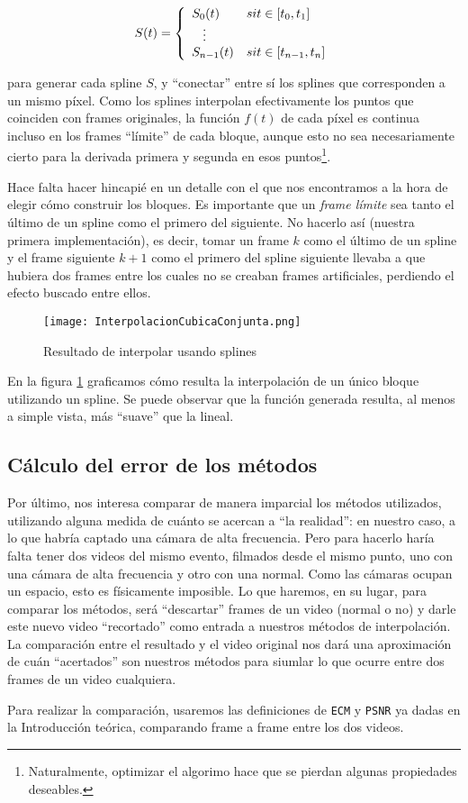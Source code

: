 $$
S(t) = 
\left\{
    \begin{array}{ll}
        S_0(t)  & \mbox{si } t \in [t_{0}, t_1] \\
        \hspace{0.3cm}\vdots \\     
        S_{n - 1}(t) & \mbox{si } t \in [t_{n - 1}, t_n]
    \end{array}
\right.
$$

para generar cada spline $S$, y ``conectar'' entre sí los splines que corresponden a un mismo píxel. Como los splines interpolan efectivamente los puntos que coinciden con frames originales, la función $f(t)$ de cada píxel es continua incluso en los frames ``límite'' de cada bloque, aunque esto no sea necesariamente cierto para la derivada primera y segunda en esos puntos\footnote{Naturalmente, optimizar el algorimo hace que se pierdan algunas propiedades deseables.}.

Hace falta hacer hincapié en un detalle con el que nos encontramos a la hora de elegir cómo construir los bloques. Es importante que un \emph{frame límite} sea tanto el último de un spline como el primero del siguiente. No hacerlo así (nuestra primera implementación), es decir, tomar un frame $k$ como el último de un spline y el frame siguiente $k+1$ como el primero del spline siguiente llevaba a que hubiera dos frames entre los cuales no se creaban frames artificiales, perdiendo el efecto buscado entre ellos.

\begin{figure}[h!]
  \centering
    \texttt{[image: InterpolacionCubicaConjunta.png]}
     \caption{Resultado de interpolar usando splines}\label{fig:intConjuntaSplines}
\end{figure}
\noindent

En la figura \ref{fig:intConjuntaSplines} graficamos cómo resulta la interpolación de un único bloque utilizando un spline. Se puede observar que la función generada resulta, al menos a simple vista, más ``suave'' que la lineal.

\subsection{Cálculo del error de los métodos}
Por último, nos interesa comparar de manera imparcial los métodos utilizados, utilizando alguna medida de cuánto se acercan a ``la realidad'': en nuestro caso, a lo que habría captado una cámara de alta frecuencia. Pero para hacerlo haría falta tener dos videos del mismo evento, filmados desde el mismo punto, uno con una cámara de alta frecuencia y otro con una normal. Como las cámaras ocupan un espacio, esto es físicamente imposible\cite{wiki_impenetrability}. Lo que haremos, en su lugar, para comparar los métodos, será ``descartar'' frames de un video (normal o no) y darle este nuevo video ``recortado'' como entrada a nuestros métodos de interpolación. La comparación entre el resultado y el video original nos dará una aproximación de cuán ``acertados'' son nuestros métodos para siumlar lo que ocurre entre dos frames de un video cualquiera.

Para realizar la comparación, usaremos las definiciones de \texttt{ECM} y \texttt{PSNR} ya dadas en la Introducción teórica, comparando frame a frame entre los dos videos.